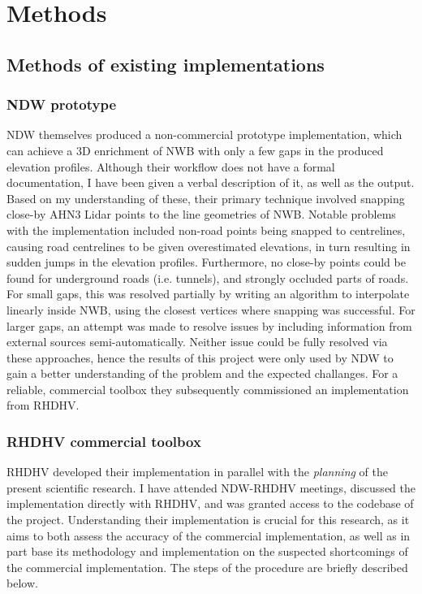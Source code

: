 \section{Methods}
\label{sec:methods}
\subsection{Methods of existing implementations}
\subsubsection*{NDW prototype}

NDW themselves produced a non-commercial prototype implementation, which can achieve a 3D enrichment of NWB with only a few gaps in the produced elevation profiles. Although their workflow does not have a formal documentation, I have been given a verbal description of it, as well as the output. Based on my understanding of these, their primary technique involved snapping close-by AHN3 Lidar points to the line geometries of NWB. Notable problems with the implementation included non-road points being snapped to centrelines, causing road centrelines to be given overestimated elevations, in turn resulting in sudden jumps in the elevation profiles. Furthermore, no close-by points could be found for underground roads (i.e. tunnels), and strongly occluded parts of roads. For small gaps, this was resolved partially by writing an algorithm to interpolate linearly inside NWB, using the closest vertices where snapping was successful. For larger gaps, an attempt was made to resolve issues by including information from external sources semi-automatically. Neither issue could be fully resolved via these approaches, hence the results of this project were only used by NDW to gain a better understanding of the problem and the expected challanges. For a reliable, commercial toolbox they subsequently commissioned an implementation from RHDHV.

\subsubsection*{RHDHV commercial toolbox}

RHDHV developed their implementation in parallel with the \textit{planning} of the present scientific research. I have attended NDW-RHDHV meetings, discussed the implementation directly with RHDHV, and was granted access to the codebase of the project. Understanding their implementation is crucial for this research, as it aims to both assess the accuracy of the commercial implementation, as well as in part base its methodology and implementation on the suspected shortcomings of the commercial implementation. The steps of the procedure are briefly described below.


